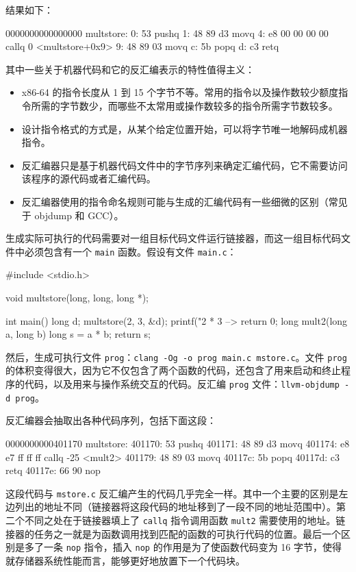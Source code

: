 结果如下：

\begin{textcode}
0000000000000000 multstore:
    0: 53                               pushq   %
    1: 48 89 d3                         movq    %
    4: e8 00 00 00 00                   callq   0 <multstore+0x9>
    9: 48 89 03                         movq    %
    c: 5b                               popq    %
    d: c3                               retq
\end{textcode}

其中一些关于机器代码和它的反汇编表示的特性值得主义：

\begin{itemize}
    \item x86-64 的指令长度从 1 到 15 个字节不等。常用的指令以及操作数较少额度指令所需的字节数少，而哪些不太常用或操作数较多的指令所需字节数较多。
    \item 设计指令格式的方式是，从某个给定位置开始，可以将字节唯一地解码成机器指令。
    \item 反汇编器只是基于机器代码文件中的字节序列来确定汇编代码，它不需要访问该程序的源代码或者汇编代码。
    \item 反汇编器使用的指令命名规则可能与生成的汇编代码有一些细微的区别（常见于 objdump 和 GCC）。
\end{itemize}

生成实际可执行的代码需要对一组目标代码文件运行链接器，而这一组目标代码文件中必须包含有一个 \verb|main| 函数。假设有文件 \verb|main.c|：

\begin{cppcode}
#include <stdio.h>

void multstore(long, long, long *);

int main() {
    long d;
    multstore(2, 3, &d);
    printf("2 * 3 --> %
    return 0;
}
long mult2(long a, long b) {
    long s = a * b;
    return s;
}
\end{cppcode}

然后，生成可执行文件 \verb|prog|：\verb|clang -Og -o prog main.c mstore.c|。文件 \verb|prog| 的体积变得很大，因为它不仅包含了两个函数的代码，还包含了用来启动和终止程序的代码，以及用来与操作系统交互的代码。反汇编 \verb|prog| 文件：\verb|llvm-objdump -d prog|。

反汇编器会抽取出各种代码序列，包括下面这段：

\begin{textcode}
0000000000401170 multstore:
  401170: 53                            pushq   %
  401171: 48 89 d3                      movq    %
  401174: e8 e7 ff ff ff                callq   -25 <mult2>
  401179: 48 89 03                      movq    %
  40117c: 5b                            popq    %
  40117d: c3                            retq
  40117e: 66 90                         nop
\end{textcode}

这段代码与 \verb|mstore.c| 反汇编产生的代码几乎完全一样。其中一个主要的区别是左边列出的地址不同（链接器将这段代码的地址移到了一段不同的地址范围中）。第二个不同之处在于链接器填上了 \verb|callq| 指令调用函数 \verb|mult2| 需要使用的地址。链接器的任务之一就是为函数调用找到匹配的函数的可执行代码的位置。最后一个区别是多了一条 \verb|nop| 指令，插入 \verb|nop| 的作用是为了使函数代码变为 16 字节，使得就存储器系统性能而言，能够更好地放置下一个代码块。

\endinput
